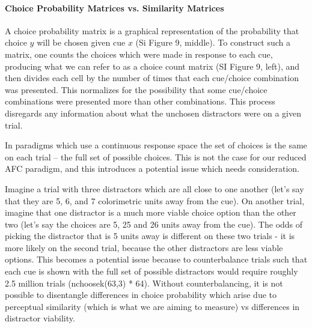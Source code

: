 \documentclass[9pt,biorxiv,lineno,onehalfspacing]{lapreprint}
\begin{document}
\begin{refsection}
\paragraph{Choice Probability Matrices vs. Similarity Matrices}

A choice probability matrix is a graphical representation of the probability that choice $y$ will be chosen given cue $x$ (Si Figure 9, middle).
To construct such a matrix, one counts the choices which were made in response to each cue, producing what we can refer to as a choice count matrix (SI Figure 9, left), and then divides each cell by the number of times that each cue/choice combination was presented. 
This normalizes for the possibility that some cue/choice combinations were presented more than other combinations. 
This process disregards any information about what the unchosen distractors were on a given trial.

In paradigms which use a continuous response space the set of choices is the same on each trial – the full set of possible choices. 
This is not the case for our reduced AFC paradigm, and this introduces a potential issue which needs consideration.

Imagine a trial with three distractors which are all close to one another (let's say that they are 5, 6, and 7 colorimetric units away from the cue).
On another trial, imagine that one distractor is a much more viable choice option than the other two (let's say the choices are 5, 25 and 26 units away from the cue).
The odds of picking the distractor that is 5 units away is different on these two trials - it is more likely on the second trial, because the other distractors are less viable options. 
This becomes a potential issue because to counterbalance trials such that each cue is shown with the full set of possible distractors would require roughly 2.5 million trials (nchoosek(63,3) * 64).
Without counterbalancing, it is not possible to disentangle differences in choice probability which arise due to perceptual similarity (which is what we are aiming to measure) vs differences in distractor viability.


\end{refsection}
\end{document}
